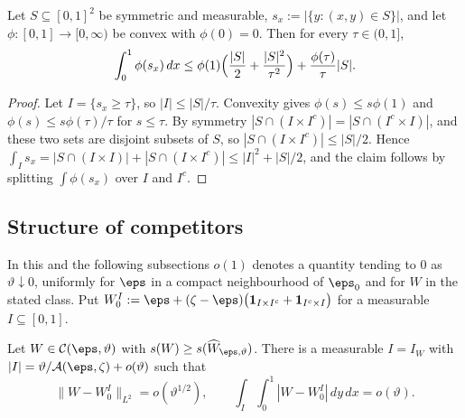 \begin{lemma}\label{kb:lem:cross}
Let $S\subseteq[0,1]^2$ be symmetric and measurable, $s_x:=|\{y:(x,y)\in S\}|$,
and let $\phi:[0,1]\to[0,\infty)$ be convex with $\phi(0)=0$.  Then for every
$\tau\in(0,1]$,
\[
  \int_0^1\phi(s_x)\,dx
  \le\phi(1)\Bigl(\frac{|S|}2+\frac{|S|^2}{\tau^2}\Bigr)
     +\frac{\phi(\tau)}\tau|S|.
\]
\end{lemma}

\begin{proof}
Let $I=\{s_x\ge\tau\}$, so $|I|\le|S|/\tau$.  Convexity gives
$\phi(s)\le s\phi(1)$ and $\phi(s)\le s\phi(\tau)/\tau$ for $s\le\tau$.  By
symmetry $|S\cap(I\times I^c)|=|S\cap(I^c\times I)|$, and these two sets are
disjoint subsets of $S$, so $|S\cap(I\times I^c)|\le|S|/2$.  Hence
$\int_Is_x=|S\cap(I\times I)|+|S\cap(I\times I^c)|\le|I|^2+|S|/2$, and the
claim follows by splitting $\int\phi(s_x)$ over $I$ and $I^c$.
\end{proof}

\subsection{Structure of competitors}
\label{kb:sec:structure}

In this and the following subsections $o(1)$ denotes a quantity tending to $0$
as $\vartheta\downarrow0$, uniformly for $\eps$ in a compact neighbourhood of
$\eps_0$ and for $W$ in the stated class.  Put
$W_0^{I}:=\eps+(\zeta-\eps)\bigl(\mathbf 1_{I\times I^c}+\mathbf 1_{I^c\times I}\bigr)$
for a measurable $I\subseteq[0,1]$.

\begin{proposition}[Structure]\label{kb:prop:structure}
Let $W\in\mathcal C(\eps,\vartheta)$ with $s(W)\ge s(\widehat W_{\eps,\vartheta})$.
There is a measurable $I=I_W$ with
$|I|=\vartheta/\mathcal A(\eps,\zeta)+o(\vartheta)$ such that
\[
  \|W-W_0^{I}\|_{L^2}=o(\vartheta^{1/2}),
  \qquad
  \int_I\!\int_0^1|W-W_0^{I}|\,dy\,dx=o(\vartheta).
\]
\end{proposition}

